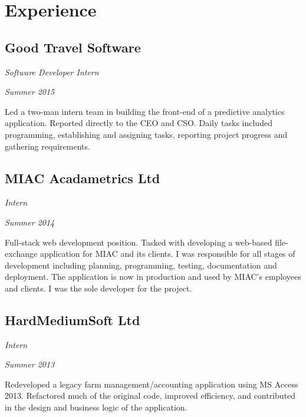 \section*{Experience}

\subsection*{Good Travel Software}
\noindent\begin{minipage}[b]{0.5\textwidth}
  \flushleft
  \emph{Software Developer Intern}
\end{minipage}
\noindent\begin{minipage}[b]{0.5\textwidth}
  \flushright
  \emph{Summer 2015}
\end{minipage}
Led a two-man intern team in building the front-end of a predictive analytics application. Reported directly to the CEO and CSO. Daily tasks included programming, establishing and assigning tasks, reporting project progress and gathering requirements.

\subsection*{MIAC Acadametrics Ltd}
\noindent\begin{minipage}[b]{0.5\textwidth}
  \flushleft
  \emph{Intern}
\end{minipage}
\noindent\begin{minipage}[b]{0.5\textwidth}
  \flushright
  \emph{Summer 2014}
\end{minipage}
Full-stack web development position. Tasked with developing a web-based  file-exchange application for MIAC and its clients. I was responsible for all stages of development including planning, programming, testing, documentation and deployment. The application is now in production and used by MIAC's employees and clients. I was the sole developer for the project.

\subsection*{HardMediumSoft Ltd}
\noindent\begin{minipage}[b]{0.5\textwidth}
  \flushleft
  \emph{Intern}
\end{minipage}
\noindent\begin{minipage}[b]{0.5\textwidth}
  \flushright
  \emph{Summer 2013}
\end{minipage}
Redeveloped a legacy farm management/accounting application using MS Access 2013. Refactored much of the original code, improved efficiency, and contributed in the design and business logic of the application.

